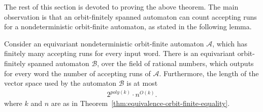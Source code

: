\documentclass{theoretics}
\newcommand{\Aa}{{\mathcal A}}
\newcommand{\Bb}{{\mathcal B}}
\begin{document}
The rest of this section is devoted to proving the above theorem. The main observation is that an orbit-finitely spanned automaton can count accepting runs for a nondeterministic orbit-finite automaton, as stated in the following lemma. 
\begin{lemma}\label{lem:unambiguous-to-weighted} Consider an equivariant nondeterministic orbit-finite automaton $\Aa$, which has finitely many accepting runs for every input word. There is an equivariant orbit-finitely spanned automaton $\Bb$, over the field of rational numbers, which outputs for every word the number of accepting runs of $\Aa$.  Furthermore, the length of the vector space used by the automaton $\Bb$ is at most 
    \begin{align}\label{eq:length-bound}
        2^{poly(k)} \cdot n^{O(k)}. 
        \end{align}
where $k$ and $n$ are as in Theorem~\ref{thm:equivalence-orbit-finite-equality}.
\end{lemma}
\end{document}
